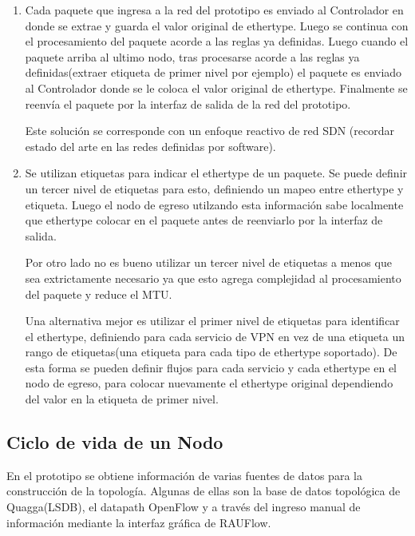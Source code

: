 \begin{enumerate}
\item Cada paquete que ingresa a la red del prototipo es enviado al Controlador en donde se extrae y guarda el valor original de ethertype. Luego se continua con el procesamiento del paquete acorde a las reglas ya definidas. Luego cuando el paquete arriba al ultimo nodo, tras procesarse acorde a las reglas ya definidas(extraer etiqueta de primer nivel por ejemplo) el paquete es enviado al Controlador donde se le coloca el valor original de ethertype. Finalmente se reenv\'ia el paquete por la interfaz de salida de la red del prototipo.

Este soluci\'on se corresponde con un enfoque reactivo de red SDN (recordar estado del arte en las redes definidas por software).

\item Se utilizan etiquetas para indicar el ethertype de un paquete. Se puede definir un tercer nivel de etiquetas para esto, definiendo un mapeo entre ethertype y etiqueta. Luego el nodo de egreso utilzando esta informaci\'on sabe localmente que ethertype colocar en el paquete antes de reenviarlo por la interfaz de salida. 

Por otro lado no es bueno utilizar un tercer nivel de etiquetas a menos que sea extrictamente necesario ya que esto agrega complejidad al procesamiento del paquete y reduce el MTU. 

Una alternativa mejor es utilizar el primer nivel de etiquetas para identificar el ethertype, definiendo para cada servicio de VPN en vez de una etiqueta un rango de etiquetas(una etiqueta para cada tipo de ethertype soportado). De esta forma se pueden definir flujos para cada servicio y cada ethertype en el nodo de egreso, para colocar nuevamente el ethertype original dependiendo del valor en la etiqueta de primer nivel. 

\end{enumerate} 

\subsection{Ciclo de vida de un Nodo}

En el prototipo se obtiene informaci\'on de varias fuentes de datos para la construcci\'on de la topolog\'ia. Algunas de ellas son la base de datos topol\'ogica de Quagga(LSDB), el datapath OpenFlow y a través del ingreso manual de informaci\'on mediante la interfaz gr\'afica de RAUFlow.

